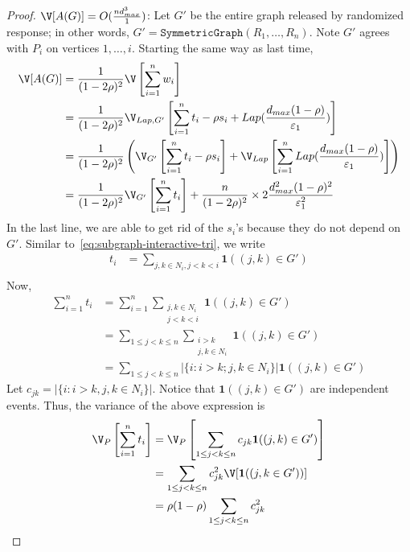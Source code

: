 \begin{proof}
  \noindent
  \textbf{$\V[A(G)] = O(\frac{nd_{max}^3}{1})$}:
  Let $G'$ be the entire graph released by randomized response; in other words,
  $G' = \texttt{SymmetricGraph}(R_1,\ldots, R_n)$. Note $G'$ agrees with $P_i$ on
  vertices $1,\ldots, i$. 
  Starting the same way as last time,
  \begin{align*}
    \V[A(G)] &= \frac{1}{(1-2\rho)^2}\V\left[\sum_{i=1}^n w_i\right] \\
    &= \frac{1}{(1-2\rho)^2}\V_{Lap, G'}\left[\sum_{i=1}^n
    t_i - \rho s_i +
    Lap(\frac{d_{max}(1-\rho)}{\varepsilon_1})\right] \\
    &= \frac{1}{(1-2\rho)^2}\left(\V_{G'}\left[\sum_{i=1}^n
    t_i - \rho s_i \right] +
    \V_{Lap}\left[\sum_{i=1}^n
    Lap(\frac{d_{max}(1-\rho)}{\varepsilon_1})\right]\right) \\
    &= \frac{1}{(1-2\rho)^2}\V_{G'}\left[\sum_{i=1}^n
    t_i \right] + \frac{n}{(1-2\rho)^2}\times
    2\frac{d_{max}^2(1-\rho)^2}{\varepsilon_1^2}
  \end{align*}
  In the last line, we are able to get rid of the $s_i$'s because they do not
  depend on $G'$. Similar to~\eqref{eq:subgraph-interactive-tri}, we write
  \begin{align*}
    t_i &= \sum_{j,k \in N_i, j<k<i} \textbf{1}((j,k) \in G') \\
  \end{align*}
Now,
  \begin{align*}
    \sum_{i=1}^n t_i &= \sum_{i=1}^n\sum_{\substack{j,k \in N_i \\ j<k<i }} \textbf{1}((j,k) \in
    G') \\
    &= \sum_{1 \leq j < k \leq n} \sum_{\substack{i > k \\ j,k \in N_i
    }} \textbf{1}((j,k) \in G') \\
    &= \sum_{1 \leq j < k \leq n} |\{i : i>k; j,k \in N_i\}| \textbf{1}((j,k)
    \in G')
  \end{align*}
  Let $c_{jk} = |\{i : i>k, j,k \in N_i\}|$. Notice that $\textbf{1}( (j,k) \in G')$
  are independent events. Thus, the variance of the above expression is
  \begin{align}
    \V_P\left[\sum_{i=1}^n t_i\right] &= \V_P \left[\sum_{1 \leq j < k \leq n}
    c_{jk} \textbf{1}( (j,k) \in G') \right] \nonumber \\
    &= \sum_{1 \leq j < k \leq n} c_{jk}^2 \V[\textbf{1}( (j,k \in G')) ]
    \nonumber \\
    &= \rho (1-\rho) \sum_{1 \leq j < k \leq n} c_{jk}^2
    \label{eq:subgraph-interactive-var}

\end{align}
\end{proof}
